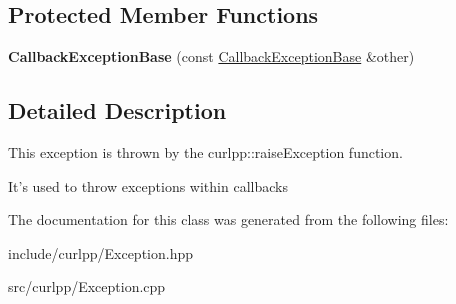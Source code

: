 \subsection*{Protected Member Functions}
\begin{DoxyCompactItemize}
\item 
\hypertarget{classcurlpp_1_1CallbackExceptionBase_a31a83304a2506ac7b6723d85a4744047}{{\bfseries Callback\-Exception\-Base} (const \hyperlink{classcurlpp_1_1CallbackExceptionBase}{Callback\-Exception\-Base} \&other)}\label{classcurlpp_1_1CallbackExceptionBase_a31a83304a2506ac7b6723d85a4744047}

\end{DoxyCompactItemize}


\subsection{Detailed Description}
This exception is thrown by the curlpp\-::raise\-Exception function. 

It's used to throw exceptions within callbacks 

The documentation for this class was generated from the following files\-:\begin{DoxyCompactItemize}
\item 
include/curlpp/Exception.\-hpp\item 
src/curlpp/Exception.\-cpp\end{DoxyCompactItemize}
